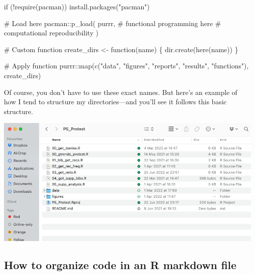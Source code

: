 \documentclass[
  letterpaper,
  DIV=11,
  numbers=noendperiod]{scrreprt}
\newenvironment{Shaded}{\begin{snugshade}}{\end{snugshade}}
\newcommand{\CommentTok}[1]{\textcolor[rgb]{0.37,0.37,0.37}{#1}}
\newcommand{\ControlFlowTok}[1]{\textcolor[rgb]{0.00,0.23,0.31}{#1}}
\newcommand{\FunctionTok}[1]{\textcolor[rgb]{0.28,0.35,0.67}{#1}}
\newcommand{\NormalTok}[1]{\textcolor[rgb]{0.00,0.23,0.31}{#1}}
\newcommand{\OtherTok}[1]{\textcolor[rgb]{0.00,0.23,0.31}{#1}}
\newcommand{\SpecialCharTok}[1]{\textcolor[rgb]{0.37,0.37,0.37}{#1}}
\newcommand{\StringTok}[1]{\textcolor[rgb]{0.13,0.47,0.30}{#1}}
\begin{document}
\begin{Shaded}
\begin{Highlighting}[]
\ControlFlowTok{if}\NormalTok{ (}\SpecialCharTok{!}\FunctionTok{require}\NormalTok{(pacman)) }\FunctionTok{install.packages}\NormalTok{(}\StringTok{"pacman"}\NormalTok{)}

\CommentTok{\# Load here}
\NormalTok{pacman}\SpecialCharTok{::}\FunctionTok{p\_load}\NormalTok{(}
\NormalTok{  purrr, }\CommentTok{\# functional programming}
\NormalTok{  here }\CommentTok{\# computational reproducibility}
\NormalTok{)}

\CommentTok{\# Custom function}
\NormalTok{create\_dirs }\OtherTok{\textless{}{-}} \ControlFlowTok{function}\NormalTok{(name) \{}
  \FunctionTok{dir.create}\NormalTok{(}\FunctionTok{here}\NormalTok{(name))}
\NormalTok{\}}

\CommentTok{\# Apply function }
\NormalTok{purrr}\SpecialCharTok{::}\FunctionTok{map}\NormalTok{(}\FunctionTok{c}\NormalTok{(}\StringTok{"data"}\NormalTok{, }\StringTok{"figures"}\NormalTok{, }\StringTok{"reports"}\NormalTok{, }\StringTok{"results"}\NormalTok{, }\StringTok{"functions"}\NormalTok{), create\_dirs)}
\end{Highlighting}
\end{Shaded}

Of course, you don't have to use these exact names. But here's an
example of how I tend to structure my directories---and you'll see it
follows this basic structure.

\includegraphics{./images/direx.png}

\hypertarget{how-to-organize-code-in-an-r-markdown-file}{%
\subsection*{How to organize code in an R markdown
file}\label{how-to-organize-code-in-an-r-markdown-file}}
\end{document}
